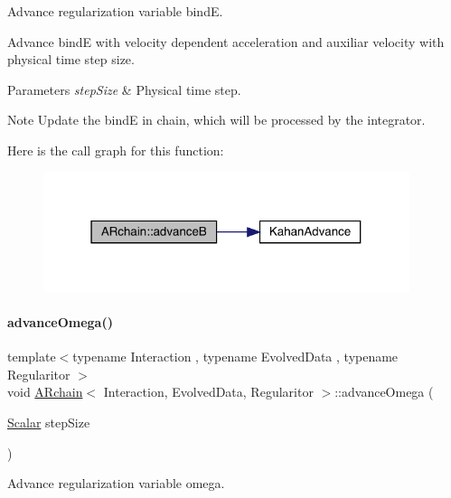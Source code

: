 Advance regularization variable bindE. 

Advance bindE with velocity dependent acceleration and auxiliar velocity with physical time step size. 
\begin{DoxyParams}{Parameters}
{\em step\+Size} & Physical time step. \\
\hline
\end{DoxyParams}
\begin{DoxyNote}{Note}
Update the bindE in chain, which will be processed by the integrator. 
\end{DoxyNote}
Here is the call graph for this function\+:\nopagebreak
\begin{figure}[H]
\begin{center}
\leavevmode
\includegraphics[width=304pt]{class_a_rchain_a1b2ae6231caeba3df20e4ab41f63a4b8_cgraph}
\end{center}
\end{figure}
\mbox{\label{class_a_rchain_ac54722bde3c9a15e04dd004ebcf0db5e}} 
\paragraph{\texorpdfstring{advance\+Omega()}{advanceOmega()}}
{\footnotesize\ttfamily template$<$typename Interaction , typename Evolved\+Data , typename Regularitor $>$ \\
void \mbox{\hyperlink{class_a_rchain}{A\+Rchain}}$<$ Interaction, Evolved\+Data, Regularitor $>$\+::advance\+Omega (\begin{DoxyParamCaption}\item[{\mbox{\hyperlink{class_a_rchain_a707e42a79e4744424a34c9007e84ee07}{Scalar}}}]{step\+Size }\end{DoxyParamCaption})\hspace{0.3cm}{\ttfamily [private]}}



Advance regularization variable omega. 

